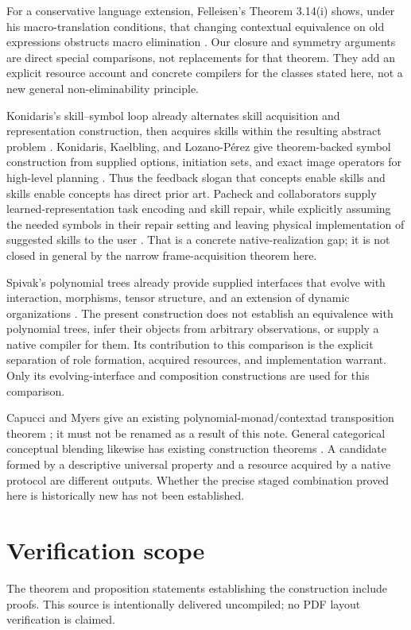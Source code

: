 \documentclass[11pt]{article}
\theoremstyle{definition}
\theoremstyle{remark}
\begin{document}
For a conservative language extension, Felleisen's Theorem 3.14(i) shows, under his macro-translation conditions, that changing contextual equivalence on old expressions obstructs macro elimination \cite{Felleisen1991}. Our closure and symmetry arguments are direct special comparisons, not replacements for that theorem. They add an explicit resource account and concrete compilers for the classes stated here, not a new general non-eliminability principle.

Konidaris's skill--symbol loop already alternates skill acquisition and representation construction, then acquires skills within the resulting abstract problem \cite{Konidaris2016}. Konidaris, Kaelbling, and Lozano-P\'erez give theorem-backed symbol construction from supplied options, initiation sets, and exact image operators for high-level planning \cite{KKL2018}. Thus the feedback slogan that concepts enable skills and skills enable concepts has direct prior art. Pacheck and collaborators supply learned-representation task encoding and skill repair, while explicitly assuming the needed symbols in their repair setting and leaving physical implementation of suggested skills to the user \cite[Section 6.1 and p.~264]{Pacheck2023}. That is a concrete native-realization gap; it is not closed in general by the narrow frame-acquisition theorem here.

Spivak's polynomial trees already provide supplied interfaces that evolve with interaction, morphisms, tensor structure, and an extension of dynamic organizations \cite{Spivak2026}. The present construction does not establish an equivalence with polynomial trees, infer their objects from arbitrary observations, or supply a native compiler for them. Its contribution to this comparison is the explicit separation of role formation, acquired resources, and implementation warrant. Only its evolving-interface and composition constructions are used for this comparison.

Capucci and Myers give an existing polynomial-monad/contextad transposition theorem \cite[Theorem 4.18]{CM2026}; it must not be renamed as a result of this note. General categorical conceptual blending likewise has existing construction theorems \cite{Blending}. A candidate formed by a descriptive universal property and a resource acquired by a native protocol are different outputs. Whether the precise staged combination proved here is historically new has not been established.

\section{Verification scope}
The theorem and proposition statements establishing the construction include proofs. This source is intentionally delivered uncompiled; no PDF layout verification is claimed.
\end{document}
